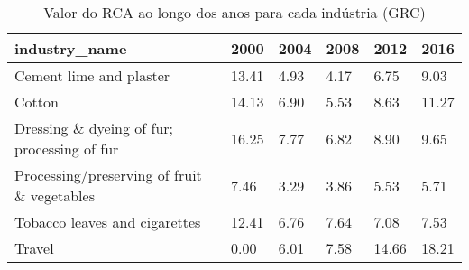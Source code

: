 \begin{table}
\centering
\caption{Valor do RCA ao longo dos anos para cada indústria (GRC)}
\begin{tabular}{p{6cm}p{1.5cm}p{1.5cm}p{1.5cm}p{1.5cm}p{1.5cm}}
\toprule
                              industry\_name &  2000 & 2004 & 2008 &  2012 &  2016 \\
\midrule
                    Cement lime and plaster & 13.41 & 4.93 & 4.17 &  6.75 &  9.03 \\
                                     Cotton & 14.13 & 6.90 & 5.53 &  8.63 & 11.27 \\
Dressing \& dyeing of fur; processing of fur & 16.25 & 7.77 & 6.82 &  8.90 &  9.65 \\
Processing/preserving of fruit \& vegetables &  7.46 & 3.29 & 3.86 &  5.53 &  5.71 \\
              Tobacco leaves and cigarettes & 12.41 & 6.76 & 7.64 &  7.08 &  7.53 \\
                                     Travel &  0.00 & 6.01 & 7.58 & 14.66 & 18.21 \\
\bottomrule
\end{tabular}
\end{table}
